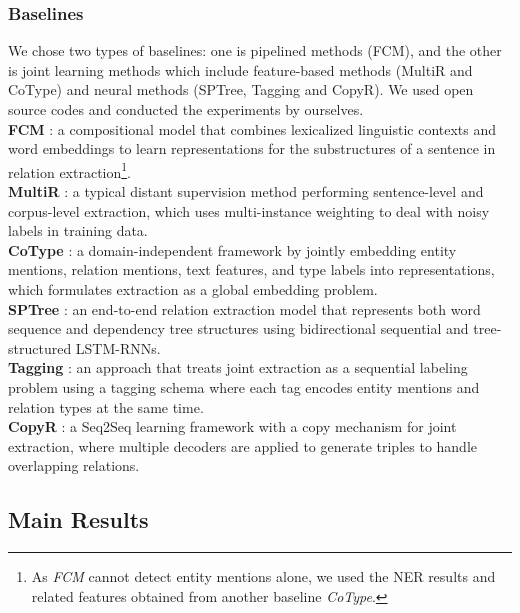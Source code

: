 \documentclass[letterpaper]{article} \usepackage{aaai19}  \usepackage{times}  \usepackage{helvet}  \usepackage{courier}  \usepackage{url}  \usepackage{graphicx}  \frenchspacing  \setlength{\pdfpagewidth}{8.5in}  \setlength{\pdfpageheight}{11in}  \usepackage{amsfonts}
\theoremstyle{definition}
\begin{document}
\subsubsection{Baselines}
We chose two types of baselines: one is pipelined methods (FCM), and the other is joint learning methods which include feature-based methods (MultiR and CoType) and neural methods (SPTree, Tagging and CopyR). We used open source codes and conducted the experiments by ourselves.
\\
\textbf{FCM} \cite{gormley2015improved}: a compositional model that combines lexicalized linguistic contexts and word embeddings to learn representations for the substructures of a sentence in relation extraction\footnote{As \textit{FCM} cannot detect entity mentions alone, we used the NER results and related features obtained from another baseline \textit{CoType}.}.
\\
\textbf{MultiR} \cite{hoffmann2011knowledge}: a typical distant supervision method performing sentence-level and corpus-level extraction, which uses multi-instance weighting to deal with noisy labels in training data.
\\
\textbf{CoType} \cite{ren2017cotype}: a domain-independent framework by jointly embedding entity mentions, relation mentions, text features, and type labels into representations, which formulates extraction as a global embedding problem. 
\\
\textbf{SPTree} \cite{miwa2016end}: an end-to-end relation extraction model that represents both word sequence and dependency tree structures using bidirectional sequential and tree-structured LSTM-RNNs.
\\
\textbf{Tagging} \cite{zheng2017joint}: an approach that treats joint extraction as a sequential labeling problem using a tagging schema where each tag encodes entity mentions and relation types at the same time.
\\
\textbf{CopyR} \cite{zeng2018extracting}: a Seq2Seq learning framework with a copy mechanism for joint extraction, where multiple decoders are applied to generate triples to handle overlapping relations.


\subsection{Main Results}
\end{document}
